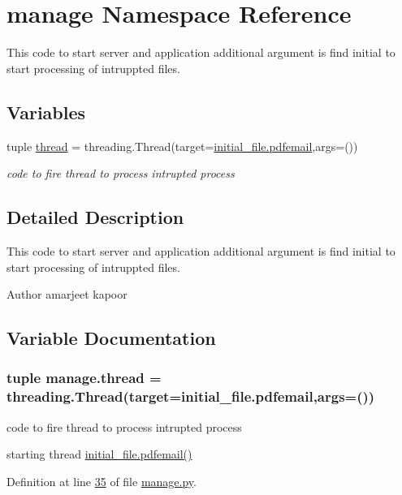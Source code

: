 \hypertarget{namespacemanage}{}\section{manage Namespace Reference}
\label{namespacemanage}


This code to start server and application additional argument is find initial to start processing of intruppted files.  


\subsection*{Variables}
\begin{DoxyCompactItemize}
\item 
tuple \hyperlink{namespacemanage_ab0c13dd165a5c8a6f3e3c029a2acd921}{thread} = threading.\+Thread(target=\hyperlink{namespaceinitial__file_a105b1aa7bf4db853b6f4d064ed224030}{initial\+\_\+file.\+pdfemail},args=())
\begin{DoxyCompactList}\small\item\em code to fire thread to process intrupted process \end{DoxyCompactList}\end{DoxyCompactItemize}


\subsection{Detailed Description}
This code to start server and application additional argument is find initial to start processing of intruppted files. 

\begin{DoxyAuthor}{Author}
amarjeet kapoor 
\end{DoxyAuthor}


\subsection{Variable Documentation}
\hypertarget{namespacemanage_ab0c13dd165a5c8a6f3e3c029a2acd921}{}
\subsubsection[{thread}]{\setlength{\rightskip}{0pt plus 5cm}tuple manage.\+thread = threading.\+Thread(target={\bf initial\+\_\+file.\+pdfemail},args=())}\label{namespacemanage_ab0c13dd165a5c8a6f3e3c029a2acd921}


code to fire thread to process intrupted process 

starting thread  \hyperlink{namespaceinitial__file_a105b1aa7bf4db853b6f4d064ed224030}{initial\+\_\+file.\+pdfemail()} 

Definition at line \hyperlink{manage_8py_source_l00035}{35} of file \hyperlink{manage_8py_source}{manage.\+py}.

